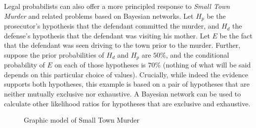 \documentclass[10pt,dvipsnames,enabledeprecatedfontcommands]{scrartcl}
\begin{document}
Legal probabilists can also offer a more principled response to
\emph{Small Town Murder} and related problems based on Bayesian
networks. Let \(H_p\) be the prosecutor's hypothesis that the defendant
committed the murder, and \(H_d\) the defense's hypothesis that the
defendant was visiting his mother. Let \(E\) be the fact that the
defendant was seen driving to the town prior to the murder. Further,
suppose the prior probabilities of \(H_d\) and \(H_p\) are \(50\%\), and
the conditional probability of \(E\) on each of those hypotheses is
\(70\%\) (nothing of what will be said depends on this particular choice
of values). Crucially, while indeed the evidence supports both
hypotheses, this example is based on a pair of hypotheses that are
neither mutually exclusive nor exhaustive. A Bayesian network can be
used to calculate other likelihood ratios for hypotheses that are
exclusive and exhaustive.

\begin{figure}[!h]
    \begin{floatrow}
        {\caption{\footnotesize Graphic model of Small Town Murder}\label{fig:bayes_test4}}
    \end{floatrow}
\end{figure}
\end{document}
